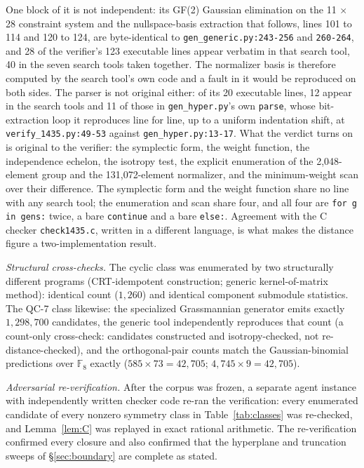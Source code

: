 \documentclass[11pt]{amsart}
\theoremstyle{plain}
\theoremstyle{definition}
\theoremstyle{remark}
\begin{document}
One block of it is not independent: its GF(2) Gaussian elimination
on the 11 $\times$ 28 constraint system and the nullspace-basis
extraction that follows, lines 101 to 114 and 120 to 124, are
byte-identical to \texttt{gen\_generic.py:243-256} and
\texttt{260-264}, and 28 of the verifier's 123 executable lines
appear verbatim in that search tool, 40 in the seven search tools
taken together. The normalizer basis is therefore computed by the
search tool's own code and a fault in it would be reproduced on both
sides. The parser is not original either: of its 20 executable
lines, 12 appear in the search tools and 11 of those in
\texttt{gen\_hyper.py}'s own \texttt{parse}, whose bit-extraction
loop it reproduces line for line, up to a uniform indentation shift, at
\texttt{verify\_1435.py:49-53} against \texttt{gen\_hyper.py:13-17}. What
the verdict turns on is original to the
verifier: the symplectic form, the weight function, the independence
echelon, the isotropy test, the explicit enumeration of the
2,048-element group and the 131,072-element normalizer, and the
minimum-weight scan over their difference. The symplectic form and
the weight function share no line with any search tool; the
enumeration and scan share four, and all four are \texttt{for g in
gens:} twice, a bare \texttt{continue} and a bare \texttt{else:}.
Agreement with the C checker \texttt{check1435.c}, written in a
different language, is what makes the distance figure a
two-implementation result.

\emph{Structural cross-checks.} The cyclic class was enumerated by two
structurally different programs (CRT-idempotent construction; generic
kernel-of-matrix method): identical count ($1{,}260$) and identical
component submodule statistics. The QC-7 class likewise: the specialized
Grassmannian generator emits exactly $1{,}298{,}700$ candidates, the
generic tool independently reproduces that count (a count-only
cross-check: candidates constructed and isotropy-checked, not
re-distance-checked), and the orthogonal-pair counts match the
Gaussian-binomial predictions over $\mathbb{F}_{8}$ exactly
($585\times73=42{,}705$; $4{,}745\times9=42{,}705$).

\emph{Adversarial re-verification.} After the corpus was frozen, a
separate agent instance with independently written checker code re-ran
the verification: every enumerated candidate of every nonzero symmetry
class in Table~\ref{tab:classes} was re-checked, and Lemma~\ref{lem:C}
was replayed in exact rational arithmetic. The re-verification confirmed
every closure and also confirmed that the hyperplane and truncation
sweeps of \S\ref{sec:boundary} are complete as stated.
\end{document}
